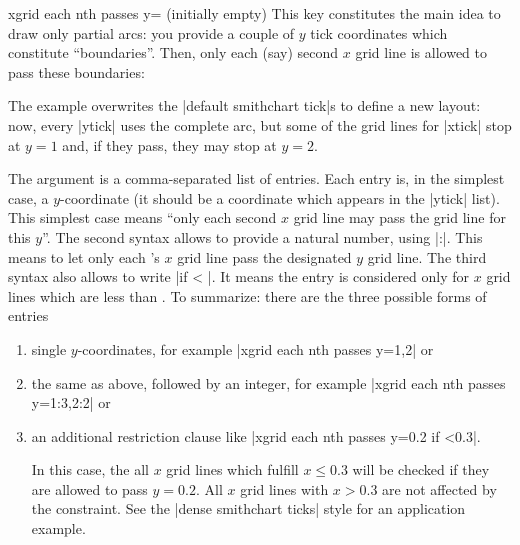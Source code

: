 \begin{pgfplotskey}{xgrid each nth passes y= (initially empty)}
    This key constitutes the main idea to draw only partial arcs: you provide a
    couple of $y$ tick coordinates which constitute ``boundaries''. Then, only
    each (say) second $x$ grid line is allowed to pass these boundaries:
\begin{codeexample}[]
\begin{tikzpicture}
\begin{smithchart}[
    xtick={0.2,0.5,1,2,5},
    ytick={
        0,
         0.2, 0.5, 1, 2, 5,
        -0.2,-0.5,-1,-2,-5
    },
    xgrid each nth passes y={1,2},
]
\end{smithchart}
\end{tikzpicture}
\end{codeexample}
    The example overwrites the |default smithchart tick|s to define a new
    layout: now, every |ytick| uses the complete arc, but some of the grid
    lines for |xtick| stop at $y=1$ and, if they pass, they may stop at $y=2$.

    The argument  is a comma-separated list of
    entries. Each entry is, in the simplest case, a $y$-coordinate (it should
    be a coordinate which appears in the |ytick| list). This simplest case
    means ``only each second $x$ grid line may pass the grid line for this
    $y$''. The second syntax allows to provide a natural number, using |:|. This means to let only each 's $x$
    grid line pass the designated $y$ grid line. The third syntax also allows
    to write |if < |. It means the entry is considered only for
    $x$ grid lines which are less than . To summarize: there are
    the three possible forms of entries
    \begin{enumerate}
        \item single $y$-coordinates, for example
            |xgrid each nth passes y={1,2}| or
        \item the same as above, followed by an integer, for example
            |xgrid each nth passes y={1:3,2:2}| or
        \item an additional restriction clause like
            |xgrid each nth passes y={0.2 if <0.3}|.

            In this case, the all $x$ grid lines which fulfill $x \le 0.3$ will
            be checked if they are allowed to pass $y=0.2$. All $x$ grid lines
            with $x > 0.3$ are not affected by the constraint. See the
            |dense smithchart ticks| style for an application example.
    \end{enumerate}


\end{pgfplotskey}

